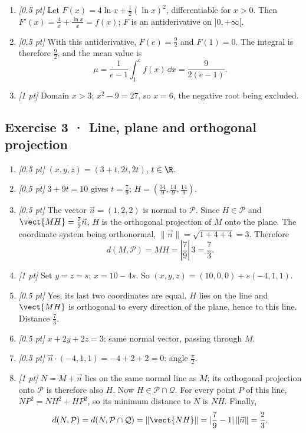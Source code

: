 \begin{enumerate}
\item \textit{[0.5 pt]} Let $F(x)=4\ln x+\frac12(\ln x)^2$, differentiable for $x>0$. Then $F'(x)=\frac{4}{x}+\frac{\ln x}{x}=f(x)$; $F$ is an antiderivative on $]0,+\infty[$.

\item \textit{[0.5 pt]} With this antiderivative, $F(e)=\frac{9}{2}$ and $F(1)=0$. The integral is therefore $\frac{9}{2}$, and the mean value is
\[\mu=\frac{1}{e-1}\int_1^e f(x)\,\dd x=\frac{9}{2(e-1)}.\]

\item \textit{[1 pt]} Domain $x>3$; $x^2-9=27$, so $x=6$, the negative root being excluded.

\end{enumerate}

\subsection*{Exercise 3 · Line, plane and orthogonal projection}\begin{enumerate}

\item \textit{[0.5 pt]} $(x,y,z)=(3+t,2t,2t)$, $t\in\R$.

\item \textit{[0.5 pt]} $3+9t=10$ gives $t=\frac{7}{9}$; $H=(\frac{34}{9},\frac{14}{9},\frac{14}{9})$.

\item \textit{[0.5 pt]} The vector $\vec n=(1,2,2)$ is normal to $\mathcal P$. Since $H\in\mathcal P$ and $\vect{MH}=\frac{7}{9}\vec n$, $H$ is the orthogonal projection of $M$ onto the plane. The coordinate system being orthonormal, $\|\vec n\|=\sqrt{1+4+4}=3$. Therefore
\[d(M,\mathcal P)=MH=|\frac{7}{9}|\,3=\frac{7}{3}.\]

\item \textit{[1 pt]} Set $y=z=s$; $x=10-4s$. So $(x,y,z)=(10,0,0)+s(-4,1,1)$.

\item \textit{[0.5 pt]} Yes, its last two coordinates are equal. $H$ lies on the line and $\vect{MH}$ is orthogonal to every direction of the plane, hence to this line. Distance $\frac{7}{3}$.

\item \textit{[0.5 pt]} $x+2y+2z=3$; same normal vector, passing through $M$.

\item \textit{[0.5 pt]} $\vec n\cdot(-4,1,1)=-4+2+2=0$: angle $\frac{\pi}{2}$.

\item \textit{[1 pt]} $N=M+\vec n$ lies on the same normal line as $M$; its orthogonal projection onto $\mathcal P$ is therefore also $H$. Now $H\in\mathcal P\cap\mathcal Q$. For every point $P$ of this line, $NP^2=NH^2+HP^2$, so its minimum distance to $N$ is $NH$. Finally,
\[d(N,\mathcal P)=d(N,\mathcal P\cap\mathcal Q)=\|\vect{NH}\|=|\frac{7}{9}-1|\,\|\vec n\|=\frac{2}{3}.\]

\end{enumerate}

